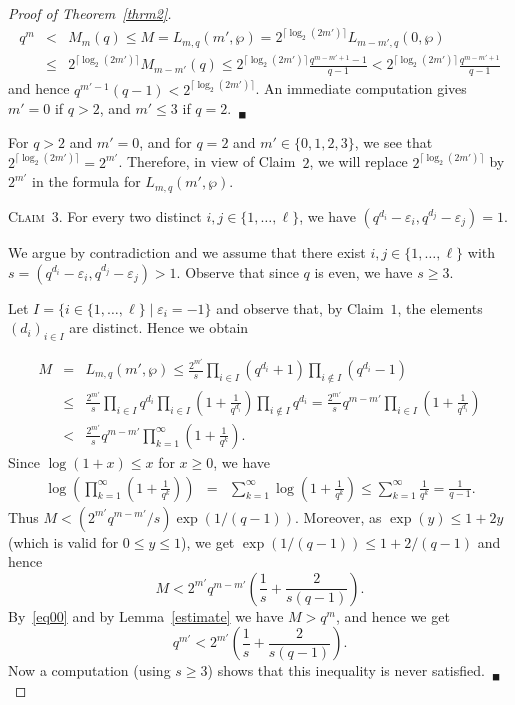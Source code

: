 \documentclass{amsart}
\begin{document}
\begin{proof}[Proof of Theorem~\ref{thrm2}]
\begin{eqnarray*}
q^m&<&M_{m}(q)\leq M=L_{m,q}({m'},\wp)=2^{\lceil \log_2(2{m'})\rceil}L_{m-{m'},q}(0,\wp)\\
&\leq&2^{\lceil\log_2(2{m'})\rceil}M_{m-{m'}}(q)\leq 2^{\lceil\log_2(2{m'})\rceil}\frac{q^{m-{m'}+1}-1}{q-1}
<2^{\lceil\log_2(2{m'})\rceil}\frac{q^{m-{m'}+1}}{q-1}
\end{eqnarray*}
and hence $q^{{m'}-1}(q-1)<2^{\lceil\log_2(2{m'})\rceil}$. An immediate computation gives ${m'}=0$ if $q>2$, and ${m'}\leq 3$ if $q=2$.~$_\blacksquare$

\smallskip

For $q>2$ and $m'=0$, and for $q=2$ and $m'\in \{0,1,2,3\}$, we see that $2^{\lceil\log_2(2m')\rceil}=2^{m'}$. Therefore, in view of Claim~$2$, we will replace $2^{\lceil\log_2(2m')\rceil}$ by $2^{m'}$ in the formula for $L_{m,q}(m',\wp)$.

\smallskip

\noindent\textsc{Claim~$3$. }For every two distinct $i,j\in \{1,\ldots,\ell\}$, we have $(q^{d_i}-\varepsilon_i,q^{d_j}-\varepsilon_j)=1$. 

\smallskip

\noindent We argue by contradiction and we assume that there exist $i,j\in \{1,\ldots,\ell\}$ with $s=(q^{d_i}-\varepsilon_i,q^{d_j}-\varepsilon_j)>1$. Observe that since $q$ is even, we have $s\geq 3$. 

Let $I=\{i\in \{1,\ldots,\ell\}\mid \varepsilon_i=-1\}$ and observe that, by Claim~$1$, the elements $(d_i)_{i\in I}$ are distinct. Hence we obtain

\begin{eqnarray*}\label{eq1}\nonumber
M&=&
L_{m,q}({m'},\wp)\leq \frac{2^{m'}}{s}\prod_{i\in  I}(q^{d_i}+1)\prod_{i\notin I}(q^{d_i}-1)\\
&\leq&
\frac{2^{m'}}{s} 
\prod_{i\in I}q^{d_i}\prod_{i\in  I}\left(1+\frac{1}{q^{d_i}}\right)\prod_{i\notin
  I}q^{d_i}=\frac{2^{m'}}{s}q^{m-m'}\prod_{i\in  I}\left(1+\frac{1}{q^{d_i}}\right)\\
&<&
\frac{2^{m'}}{s}q^{m-m'}\prod_{k=1}^\infty\left(1+\frac{1}{q^k}\right).\nonumber 
\end{eqnarray*}
Since $\log(1+x)\leq x$ for $x\geq 0$, we have
\begin{eqnarray*}
\log\left(\prod_{k=1}^\infty\left(1+\frac{1}{q^k}\right)\right)
&=&\sum_{k=1}^\infty\log\left(1+\frac{1}{q^k}\right)\leq\sum_{k=1}^\infty\frac{1}{q^k}=\frac{1}{q-1}. 
\end{eqnarray*}
Thus $M< (2^{m'}q^{m-m'}/s)\exp(1/(q-1))$. Moreover,  as $\exp(y)\leq 1+2y$ (which is valid for $0\leq y\leq 1$), we get $\exp(1/(q-1))\leq 1+2/(q-1)$ and hence
$$M<2^{m'}q^{m-m'}\left(\frac{1}{s}+\frac{2}{s(q-1)}\right).$$
By~\eqref{eq00} and by Lemma~\ref{estimate} we have $M>q^m$, and hence we  get
$$q^{{m'}}<2^{m'}\left(\frac{1}{s}+\frac{2}{s(q-1)}\right).$$
Now a computation (using $s\geq 3$) shows that this inequality is never satisfied.~$_\blacksquare$
 

\end{proof}
\end{document}
